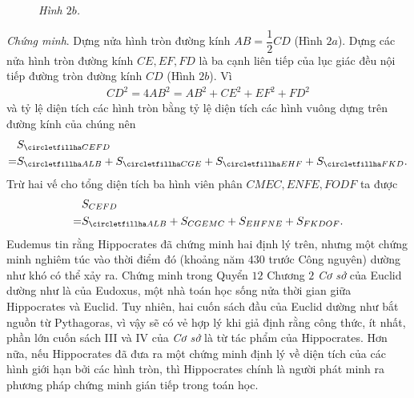 \begin{multicols}{2}
\begin{figure}[H]
		\caption{\small\textit{\color{lichsutoanhoc}Hình $2b$.}}
		\vspace*{-5pt}
	\end{figure}
	\textit{Chứng minh}. Dựng nửa hình tròn đường kính $AB = \dfrac{1}{2}CD$ (Hình $2a$). Dựng các nửa hình tròn đường kính $CE, EF, FD$ là ba cạnh liên tiếp của lục giác đều nội tiếp đường tròn đường kính  $CD$ (Hình $2b$). Vì 
	\begin{align*}
		C{D^2} = 4A{B^2} = A{B^2} + C{E^2} + E{F^2} + F{D^2}
	\end{align*}
	và tỷ lệ diện tích các hình tròn bằng tỷ lệ diện tích các hình vuông dựng trên đường kính của chúng nên 
	\begin{align*}
		&{S_{\circletfillha CEFD}} \\
		= &{S_{\circletfillha ALB}} + {S_{\circletfillha CGE}} + {S_{\circletfillha EHF}} + {S_{\circletfillha FKD}}.
	\end{align*}
	Trừ hai vế cho tổng diện tích ba hình viên phân $CMEC, ENFE, FODF$  ta được  
	\begin{align*}
		&{S_{CEFD}} \\
		= &{S_{\circletfillha ALB}} + {S_{CGEMC}} + {S_{EHFNE}} + {S_{FKDOF}}.
	\end{align*}
	Eudemus tin rằng Hippocrates đã chứng minh hai định lý trên, nhưng một chứng minh nghiêm túc vào thời điểm đó (khoảng năm $430$ trước Công nguyên) dường như khó có thể xảy ra. Chứng minh trong Quyển $12$ Chương $2$ \textit{Cơ sở} của Euclid dường như là của Eudoxus, một nhà toán học sống nửa thời gian giữa Hippocrates và Euclid. Tuy nhiên, hai cuốn sách đầu của Euclid dường như bắt nguồn từ Pythagoras, vì vậy sẽ có vẻ hợp lý khi giả định rằng công thức, ít nhất, phần lớn cuốn sách III và IV của \textit{Cơ sở}  là từ tác phẩm của Hippocrates. Hơn nữa, nếu Hippocrates đã đưa ra một chứng minh định lý về diện tích của các hình giới hạn bởi các hình tròn, thì Hippocrates chính là người phát minh ra phương pháp chứng minh gián tiếp trong toán học. 

\end{multicols}
